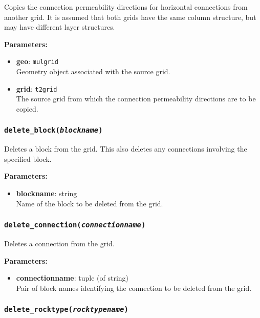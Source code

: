 Copies the connection permeability directions for horizontal connections from another grid.  It is assumed that both grids have the same column structure, but may have different layer structures.

\textbf{Parameters:}
\begin{itemize}
\item \textbf{geo}: \texttt{mulgrid}\\
  Geometry object associated with the source grid.
\item \textbf{grid}: \texttt{t2grid}\\
  The source grid from which the connection permeability directions are to be copied.
\end{itemize}

\begin{snugshade}
\subsubsection{\texttt{delete\_block(\emph{blockname})}}
\end{snugshade}
\label{sec:t2grid:delete_block}

Deletes a block from the grid.  This also deletes any connections involving the specified block.

\textbf{Parameters:}
\begin{itemize}
\item \textbf{blockname}: string\\
  Name of the block to be deleted from the grid.
\end{itemize}

\begin{snugshade}
\subsubsection{\texttt{delete\_connection(\emph{connectionname})}}
\end{snugshade}
\label{sec:t2grid:delete_connection}

Deletes a connection from the grid.

\textbf{Parameters:}
\begin{itemize}
\item \textbf{connectionname}: tuple (of string)\\
  Pair of block names identifying the connection to be deleted from the grid.
\end{itemize}

\begin{snugshade}
\subsubsection{\texttt{delete\_rocktype(\emph{rocktypename})}}
\end{snugshade}
\label{sec:t2grid:delete_rocktype}

